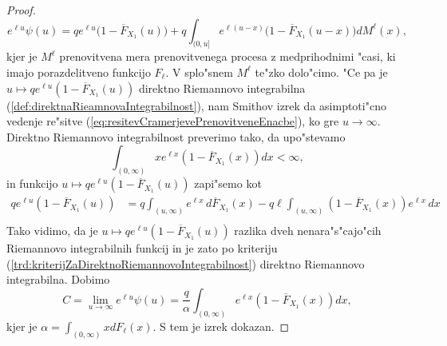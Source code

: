 \documentclass[12pt, a4paper, reqno]{amsart}
\theoremstyle{definition}
\theoremstyle{plain}
\newcommand{\1}{\mathds{1}}
\begin{document}
\begin{proof}
                \begin{equation}
                    e^{\ell u}\psi(u) =qe^{\ell u}\bigl(1 - \overline{F}_{X_1}(u)\bigr) +  q\int_{(0, u]}e^{\ell(u - x)}\bigl(1 - \overline{F}_{X_1}(u - x)\bigr)dM^{\ell}(x),
                    \label{eq:resitevCramerjevePrenovitveneEnacbe}
                \end{equation}
                kjer je $M^{\ell}$ prenovitvena mera prenovitvenega procesa z medprihodnimi "casi, 
                ki imajo porazdelitveno funkcijo $F_\ell$. V splo"snem $M^{\ell}$ te"zko dolo"cimo. 
                "Ce pa je $u\mapsto qe^{\ell u}(1 - \overline{F}_{X_1}(u))$ direktno Riemannovo integrabilna
                (\ref{def:direktnaRieamnovaIntegrabilnost}), nam 
                Smithov izrek da asimptoti"cno vedenje re"sitve (\ref{eq:resitevCramerjevePrenovitveneEnacbe}),
                ko gre $u\to\infty$.
                Direktno Riemannovo integrabilnost preverimo tako, da upo"stevamo 
                \begin{equation*}
                    \int_{(0, \infty)}xe^{\ell x}(1 - \overline{F}_{X_1}(x))dx < \infty, 
                \end{equation*}
                in funkcijo $u\mapsto qe^{\ell u}(1 - \overline{F}_{X_1}(u))$ zapi"semo kot
                \begin{align*}
                    qe^{\ell u}(1 - \overline{F}_{X_1}(u))
                     &= q\int_{(u, \infty)}e^{\ell x}\, d\overline{F}_{X_1}(x) 
                        - q\ell \int_{(u, \infty)}(1 - \overline{F}_{X_1}(x))e^{\ell x}\, dx \\                                  
                \end{align*}
                Tako vidimo, da je $u\mapsto qe^{\ell u}(1 - \overline{F}_{X_1}(u))$ razlika dveh nenara"s"cajo"cih
                Riemannovo integrabilnih funkcij in je zato po kriteriju (\ref{trd:kriterijZaDirektnoRiemannovoIntegrabilnost}) 
                direktno Riemannovo integrabilna. Dobimo 
                \begin{equation}
                    C = \lim_{u\to\infty}e^{\ell u}\psi(u) =  \frac{q}{\alpha} \int_{(0, \infty)}e^{\ell x}(1 - \overline{F}_{X_1}(x))dx,
                    \label{eq:CramerBoundConstant}
                \end{equation}
                kjer je $\alpha = \int_{(0, \infty)}x dF_\ell(x)$. S tem je izrek dokazan.
            \end{proof}
\end{document}
